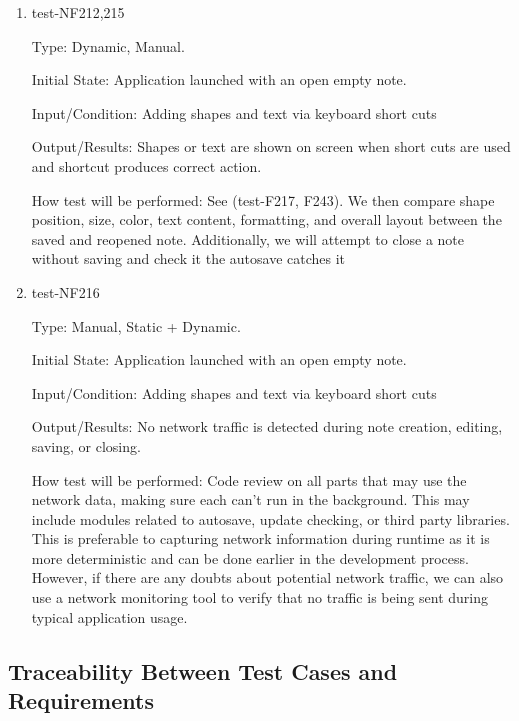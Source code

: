 \documentclass[12pt, titlepage]{article}
\begin{document}
\begin{enumerate}

\item{test-NF212,215}

Type: Dynamic, Manual.

Initial State: Application launched with an open empty note.

Input/Condition: Adding shapes and text via keyboard short cuts

Output/Results: Shapes or text are shown on screen when short cuts are used and shortcut produces correct action.

How test will be performed: See (test-F217, F243). We then compare shape position, size, color, text content, formatting, and overall layout between the saved and reopened note. Additionally, we will attempt to close a note without saving and check it the autosave catches it

\item{test-NF216}

Type: Manual, Static + Dynamic.

Initial State: Application launched with an open empty note.

Input/Condition: Adding shapes and text via keyboard short cuts

Output/Results: No network traffic is detected during note creation, editing, saving, or closing.

How test will be performed: Code review on all parts that may use the network data, making sure each can't run in the background. This may include modules related to autosave, update checking, or third party libraries. 
This is preferable to capturing network information during runtime as it is more deterministic and can be done earlier in the development process. However, if there are any doubts about potential network traffic, we can also use a network monitoring tool to verify that no traffic is being sent during typical application usage.

\end{enumerate}


\subsection{Traceability Between Test Cases and Requirements}

\end{document}
